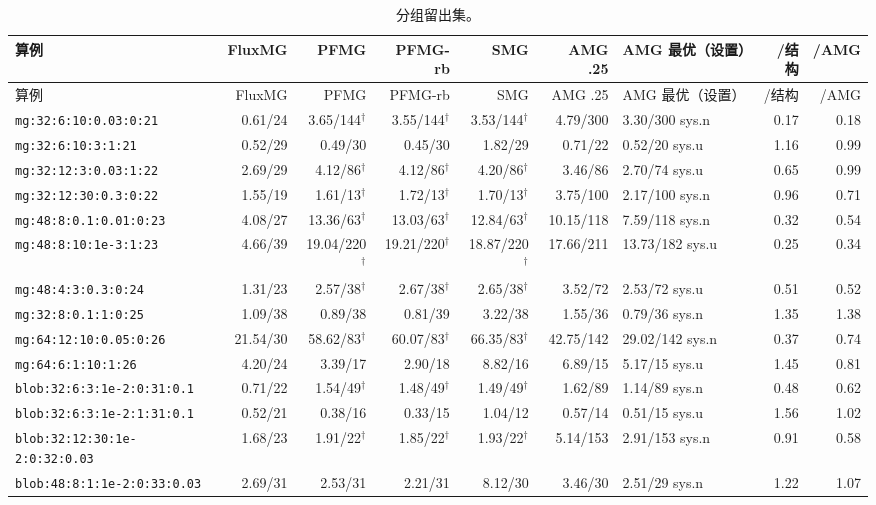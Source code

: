 {\scriptsize\setlength{\tabcolsep}{3pt}
\begin{longtable}{lrrrrrlrr}
\caption{分组留出集。}\\
\toprule
算例 & FluxMG & PFMG & PFMG-rb & SMG & AMG .25 & AMG 最优（设置） & /结构 & /AMG \\
\midrule
\endfirsthead
\toprule
算例 & FluxMG & PFMG & PFMG-rb & SMG & AMG .25 & AMG 最优（设置） & /结构 & /AMG \\
\midrule
\endhead
\bottomrule
\endlastfoot
\texttt{mg:32:6:10:0.03:0:21} & 0.61/24 & 3.65/144$^\dagger$ & 3.55/144$^\dagger$ & 3.53/144$^\dagger$ & 4.79/300 & 3.30/300 sys.n & 0.17 & 0.18 \\
\texttt{mg:32:6:10:3:1:21} & 0.52/29 & 0.49/30 & 0.45/30 & 1.82/29 & 0.71/22 & 0.52/20 sys.u & 1.16 & 0.99 \\
\texttt{mg:32:12:3:0.03:1:22} & 2.69/29 & 4.12/86$^\dagger$ & 4.12/86$^\dagger$ & 4.20/86$^\dagger$ & 3.46/86 & 2.70/74 sys.u & 0.65 & 0.99 \\
\texttt{mg:32:12:30:0.3:0:22} & 1.55/19 & 1.61/13$^\dagger$ & 1.72/13$^\dagger$ & 1.70/13$^\dagger$ & 3.75/100 & 2.17/100 sys.n & 0.96 & 0.71 \\
\texttt{mg:48:8:0.1:0.01:0:23} & 4.08/27 & 13.36/63$^\dagger$ & 13.03/63$^\dagger$ & 12.84/63$^\dagger$ & 10.15/118 & 7.59/118 sys.n & 0.32 & 0.54 \\
\texttt{mg:48:8:10:1e-3:1:23} & 4.66/39 & 19.04/220$^\dagger$ & 19.21/220$^\dagger$ & 18.87/220$^\dagger$ & 17.66/211 & 13.73/182 sys.u & 0.25 & 0.34 \\
\texttt{mg:48:4:3:0.3:0:24} & 1.31/23 & 2.57/38$^\dagger$ & 2.67/38$^\dagger$ & 2.65/38$^\dagger$ & 3.52/72 & 2.53/72 sys.u & 0.51 & 0.52 \\
\texttt{mg:32:8:0.1:1:0:25} & 1.09/38 & 0.89/38 & 0.81/39 & 3.22/38 & 1.55/36 & 0.79/36 sys.n & 1.35 & 1.38 \\
\texttt{mg:64:12:10:0.05:0:26} & 21.54/30 & 58.62/83$^\dagger$ & 60.07/83$^\dagger$ & 66.35/83$^\dagger$ & 42.75/142 & 29.02/142 sys.n & 0.37 & 0.74 \\
\texttt{mg:64:6:1:10:1:26} & 4.20/24 & 3.39/17 & 2.90/18 & 8.82/16 & 6.89/15 & 5.17/15 sys.u & 1.45 & 0.81 \\
\texttt{blob:32:6:3:1e-2:0:31:0.1} & 0.71/22 & 1.54/49$^\dagger$ & 1.48/49$^\dagger$ & 1.49/49$^\dagger$ & 1.62/89 & 1.14/89 sys.n & 0.48 & 0.62 \\
\texttt{blob:32:6:3:1e-2:1:31:0.1} & 0.52/21 & 0.38/16 & 0.33/15 & 1.04/12 & 0.57/14 & 0.51/15 sys.u & 1.56 & 1.02 \\
\texttt{blob:32:12:30:1e-2:0:32:0.03} & 1.68/23 & 1.91/22$^\dagger$ & 1.85/22$^\dagger$ & 1.93/22$^\dagger$ & 5.14/153 & 2.91/153 sys.n & 0.91 & 0.58 \\
\texttt{blob:48:8:1:1e-2:0:33:0.03} & 2.69/31 & 2.53/31 & 2.21/31 & 8.12/30 & 3.46/30 & 2.51/29 sys.n & 1.22 & 1.07 \\
\end{longtable}}
